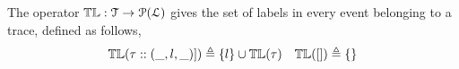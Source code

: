%
  The operator $\mathbb{TL} : \mathcal{T} \to \mathcal{P}{(\mathcal{L})}$ gives the set of labels in every event belonging to 
  a trace,
defined as follows,
\[
\mathbb{TL}{(\mathtt{\tau}  :: (\_, l, \_)])} \triangleq \{l\} \cup \mathbb{TL}{(\mathtt{\tau} )}
~~~
\mathbb{TL}({[ ]}) \triangleq \{\}
\]
%
%
%
%
%


